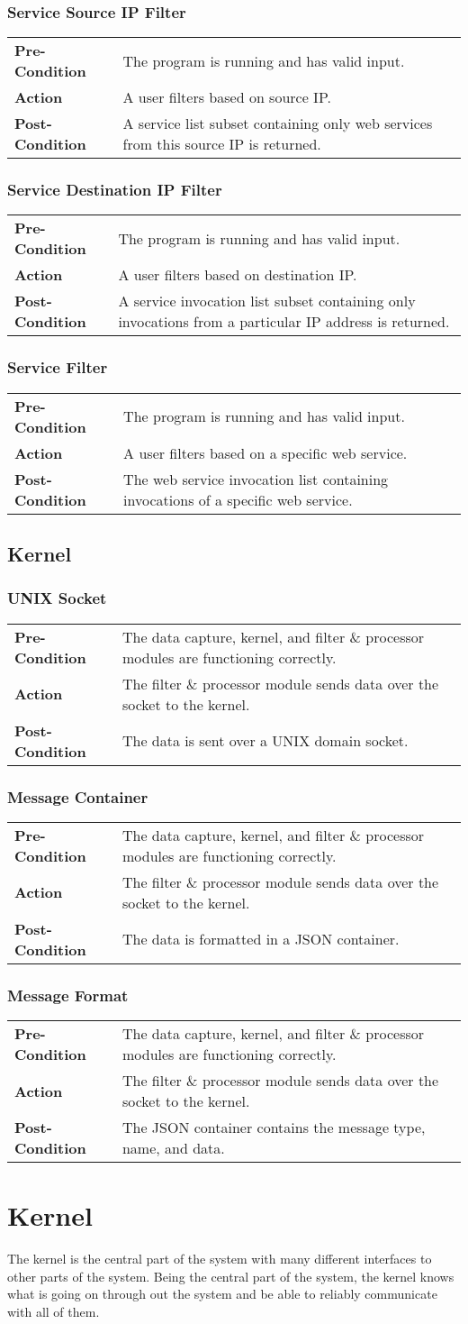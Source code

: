 \documentclass[titlepage]{article}
\newcommand{\testentry}[4]{
    \subsubsection{#1}
    \begin{center}
    \begin{tabular}{| l p{0.7\textwidth}|}
        \hline
        \bf Pre-Condition & #2 \\
        \bf Action & #3 \\
        \bf Post-Condition & #4 \\\hline
    \end{tabular}
    \end{center}
}
\begin{document}
\testentry{Service Source IP Filter}
    {The program is running and has valid input.}
    {A user filters based on source IP.}
    {A service list subset containing only web services from this source IP is
        returned.}
 
\testentry{Service Destination IP Filter}
    {The program is running and has valid input.}
    {A user filters based on destination IP.}
    {A service invocation list subset containing only invocations from a
        particular IP address is returned.}

\testentry{Service Filter}
    {The program is running and has valid input.}
    {A user filters based on a specific web service.}
    {The web service invocation list containing invocations of a specific web
        service.}


\subsection{Kernel}

\testentry{UNIX Socket}
    {The data capture, kernel, and filter \& processor modules are functioning correctly.}
    {The filter \& processor module sends data over the socket to the kernel.}
    {The data is sent over a UNIX domain socket.}

\testentry{Message Container}
    {The data capture, kernel, and filter \& processor modules are functioning correctly.}
    {The filter \& processor module sends data over the socket to the kernel.}
    {The data is formatted in a JSON container.}

\testentry{Message Format}
    {The data capture, kernel, and filter \& processor modules are functioning correctly.}
    {The filter \& processor module sends data over the socket to the kernel.}
    {The JSON container contains the message type, name, and data.}


\section{Kernel}

The kernel is the central part of the system with many different interfaces to
other parts of the system. Being the central part of the system, the kernel
knows what is going on through out the system and be able to reliably
communicate with all of them.
\end{document}
